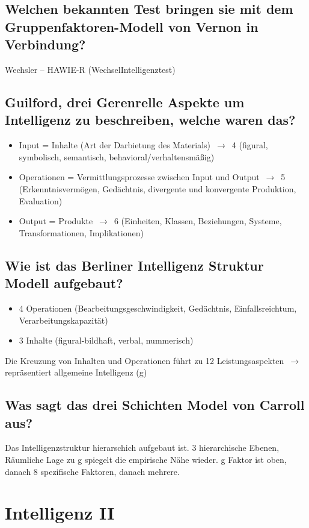 \documentclass[a6paper,9pt,DIV=14]{scrartcl}
\begin{document}
\subsection{Welchen bekannten Test bringen sie mit dem Gruppenfaktoren-Modell von Vernon in Verbindung?}
Wechsler – HAWIE-R (WechselIntelligenztest)
\subsection{Guilford, drei Gerenrelle Aspekte um Intelligenz zu beschreiben, welche waren das?} %
\begin{itemize}
\item Input = Inhalte (Art der Darbietung des Materials) $\,\to\,$ 4 (figural, symbolisch, semantisch, behavioral/verhaltensmäßig)
\item Operationen = Vermittlungsprozesse zwischen Input und Output $\,\to\,$ 5 (Erkenntnisvermögen, Gedächtnis, divergente und konvergente Produktion, Evaluation)
\item Output = Produkte $\,\to\,$ 6 (Einheiten, Klassen, Beziehungen, Systeme, Transformationen, Implikationen)
\end{itemize}
\subsection{Wie ist das Berliner Intelligenz Struktur Modell aufgebaut?}
\begin{itemize}
\item 4 Operationen (Bearbeitungsgeschwindigkeit, Gedächtnis, Einfallsreichtum, Verarbeitungskapazität)
\item 3 Inhalte (figural-bildhaft, verbal, nummerisch)
\end{itemize}
Die Kreuzung von Inhalten und Operationen führt zu 12 Leistungsaspekten $\,\to\,$ repräsentiert allgemeine Intelligenz (g)
\subsection{Was sagt das drei Schichten Model von Carroll aus?} %
Das Intelligenzstruktur hierarschich aufgebaut ist. 3 hierarchische Ebenen, Räumliche Lage zu g spiegelt die empirische Nähe wieder. g Faktor ist oben, danach 8 spezifische Faktoren, danach mehrere.


\section{Intelligenz II}
\end{document}
